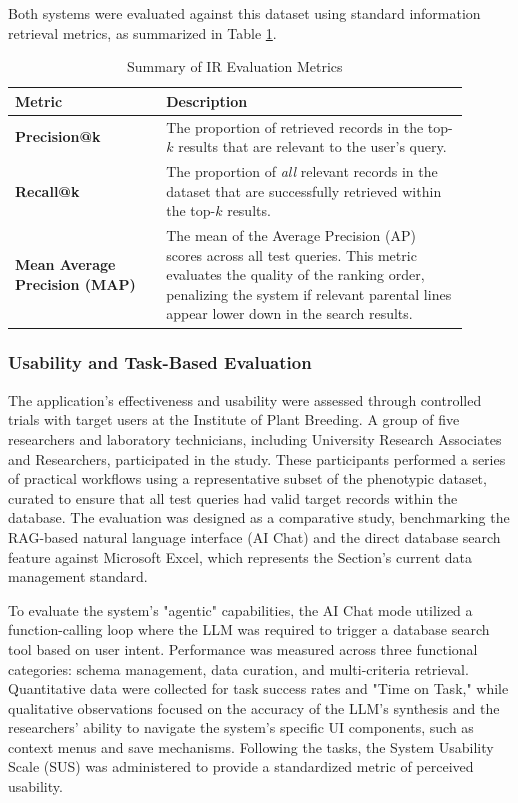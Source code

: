 \documentclass[journal]{./IEEE/IEEEtran}
\begin{document}
Both systems were evaluated against this dataset using standard information retrieval metrics, as summarized in Table \ref{tab:metrics}.

\begin{table}[htbp]
\caption{Summary of IR Evaluation Metrics}
\label{tab:metrics}
\centering
\begin{tabular}{|p{0.3\linewidth}|p{0.6\linewidth}|}
\hline
\textbf{Metric} & \textbf{Description} \\
\hline
\textbf{Precision@k} & 
The proportion of retrieved records in the top-$k$ results that are relevant to the user's query.\\
\hline
\textbf{Recall@k} & 
The proportion of \textit{all} relevant records in the dataset that are successfully retrieved within the top-$k$ results.\\
\hline
\textbf{Mean Average Precision (MAP)} & 
The mean of the Average Precision (AP) scores across all test queries. This metric evaluates the quality of the ranking order, penalizing the system if relevant parental lines appear lower down in the search results. \\
\hline
\end{tabular}
\end{table}

\subsubsection{Usability and Task-Based Evaluation}
The application’s effectiveness and usability were assessed through controlled trials with target users at the Institute of Plant Breeding. A group of five researchers and laboratory technicians, including University Research Associates and Researchers, participated in the study. These participants performed a series of practical workflows using a representative subset of the phenotypic dataset, curated to ensure that all test queries had valid target records within the database. The evaluation was designed as a comparative study, benchmarking the RAG-based natural language interface (AI Chat) and the direct database search feature against Microsoft Excel, which represents the Section's current data management standard.

To evaluate the system's "agentic" capabilities, the AI Chat mode utilized a function-calling loop where the LLM was required to trigger a database search tool based on user intent. Performance was measured across three functional categories: schema management, data curation, and multi-criteria retrieval. Quantitative data were collected for task success rates and "Time on Task," while qualitative observations focused on the accuracy of the LLM’s synthesis and the researchers' ability to navigate the system's specific UI components, such as context menus and save mechanisms. Following the tasks, the System Usability Scale (SUS) was administered to provide a standardized metric of perceived usability.
\end{document}
